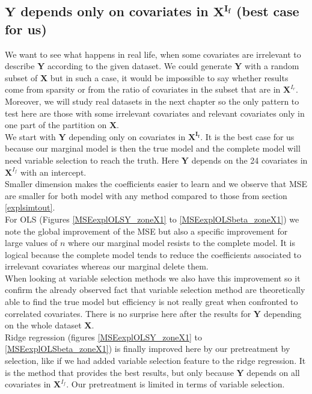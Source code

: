 \documentclass[12pt,a4paper]{report}
\begin{document}
\clearpage
\newpage
\subsection{$\boldsymbol{Y}$ depends only on covariates in $\boldsymbol{X^{I_f}}$ (best case for us)}	 \label{tableMSEsimdroite}
\FloatBarrier
 We want to see what happens in real life, when some covariates are irrelevant to describe $\boldsymbol{Y}$ according to the given dataset. We could generate $\boldsymbol{Y}$ with a random subset of $\boldsymbol{X}$ but in such a case, it would be impossible to say whether results come from sparsity or from the ratio of covariates in the subset that are in $\boldsymbol{X}^{I_r}$. Moreover, we will study real datasets in the next chapter so the only pattern to test here are those with some irrelevant covariates and relevant covariates only in one part of the partition on $\boldsymbol{X}$. \\
 	We start with $\boldsymbol{Y}$ depending only on covariates in $\boldsymbol{X^{I_f}}$. It is the best case for us because our marginal model is then the true model and the complete model will need variable selection to reach the truth. Here $\boldsymbol{Y}$ depends on the 24 covariates in $\boldsymbol{X}^{I_f}$ with an intercept.\\
 	Smaller dimension makes the coefficients easier to learn and we observe that MSE are smaller for both model with any method compared to those from section \ref{explsimtout}.\\
 	For OLS (Figures \ref{MSEexplOLSY_zoneX1} to \ref{MSEexplOLSbeta_zoneX1}) we note the global improvement of the MSE but also a specific improvement for large values of $n$ where our marginal model resists to the complete model. It is logical because the complete model tends to reduce the coefficients associated to irrelevant covariates whereas our marginal delete them. \\
 	
 	When looking at variable selection methods we also have this improvement so it confirm the already observed fact that variable selection method are theoretically able to find the true model but efficiency is not really great when confronted to correlated covariates. There is no surprise here after the results for $\boldsymbol{Y}$ depending on the whole dataset $\boldsymbol{X}$. \\
 	
 	Ridge regression (figures \ref{MSEexplOLSY_zoneX1} to \ref{MSEexplOLSbeta_zoneX1}) is finally  improved here by our pretreatment by selection, like if we had added variable selection feature to the ridge regression. It is the method that provides the best results, but only because $\boldsymbol{Y}$ depends on all covariates in $\boldsymbol{X}^{I_f}$. Our pretreatment is limited in terms of variable selection.
 	
\end{document}
